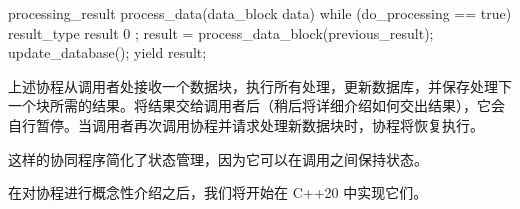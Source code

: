 \begin{cpp}
processing_result process_data(data_block data) {
    while (do_processing == true) {
        result_type result{ 0 };
        result = process_data_block(previous_result);
        update_database();
        yield result;
    }
}
\end{cpp}

上述协程从调用者处接收一个数据块，执行所有处理，更新数据库，并保存处理下一个块所需的结果。将结果交给调用者后（稍后将详细介绍如何交出结果），它会自行暂停。当调用者再次调用协程并请求处理新数据块时，协程将恢复执行。

这样的协同程序简化了状态管理，因为它可以在调用之间保持状态。

在对协程进行概念性介绍之后，我们将开始在 C++20 中实现它们。















